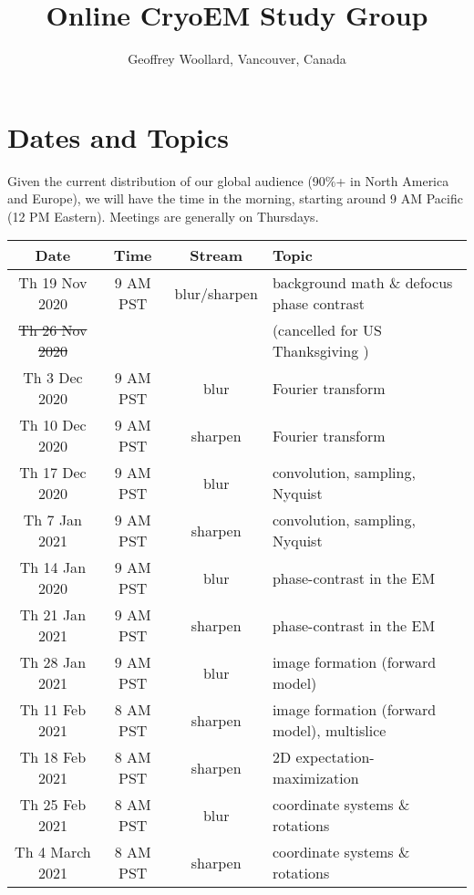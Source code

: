 \documentclass[11pt, oneside]{article}   	%
\title{Online CryoEM Study Group}
\author{Geoffrey Woollard, Vancouver, Canada}
\begin{document}
\maketitle

\tableofcontents



\pagebreak
\section{Dates and Topics}
Given the current distribution of our global audience (90\%+  in North America and Europe), we will have the time in the morning, starting around 9 AM Pacific (12 PM Eastern). Meetings are generally on Thursdays.

\begin{center}
\small
 \begin{longtable}{|| c c c p{90mm} ||} 
 \hline
 Date & Time & Stream & Topic \\ [0.5ex] 
 \hline\hline
Th 19 Nov 2020 & \tiny{9 AM PST} &  blur/sharpen & background math \& defocus phase contrast  \\ 
 \hline
\sout{Th 26 Nov 2020}  &   & & (cancelled for US Thanksgiving )    \\ 
 \hline
Th 3 Dec 2020 & \tiny{9 AM PST} & blur & Fourier transform   \\ 
 \hline
Th 10 Dec 2020 & \tiny{9 AM PST} & sharpen & Fourier transform   \\ 
 \hline
Th 17 Dec 2020 & \tiny{9 AM PST} & blur & convolution, sampling, Nyquist   \\ 
 \hline
Th 7 Jan 2021 & \tiny{9 AM PST} & sharpen & convolution, sampling, Nyquist   \\ 
 \hline
Th 14 Jan 2020 & \tiny{9 AM PST} & blur & phase-contrast in the EM   \\ 
 \hline
Th 21 Jan 2021 & \tiny{9 AM PST} & sharpen & phase-contrast in the EM   \\ 
 \hline
Th 28 Jan 2021 & \tiny{9 AM PST} & blur & image formation (forward model)   \\ 
 \hline
Th 11 Feb 2021 & \tiny{8 AM PST} & sharpen & image formation (forward model), multislice   \\ 
 \hline
Th 18 Feb 2021 & \tiny{8 AM PST} & sharpen &  2D expectation-maximization \\ 
 \hline
Th 25 Feb 2021 & \tiny{8 AM PST} & blur & coordinate systems \& rotations  \\ 
 \hline
 Th 4 March 2021 & \tiny{8 AM PST} & sharpen & coordinate systems \& rotations  \\ 

\end{longtable}
\end{center}
\end{document}
